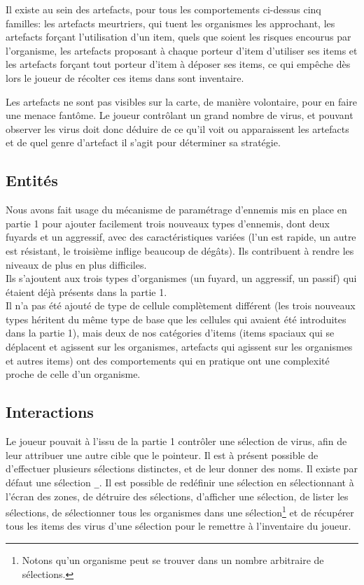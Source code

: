\documentclass[a4paper,french]{article}
\begin{document}
Il existe au sein des artefacts, pour tous les comportements ci-dessus cinq
familles: les artefacts meurtriers, qui tuent les organismes les approchant,
les artefacts forçant l'utilisation d'un item, quels que soient les risques
encourus par l'organisme, les artefacts proposant à chaque porteur d'item
d'utiliser ses items et les artefacts forçant tout porteur d'item à déposer ses
items, ce qui empêche dès lors le joueur de récolter ces items dans sont
inventaire.
\medskip

Les artefacts ne sont pas visibles sur la carte, de manière volontaire, pour en
faire une menace fantôme. Le joueur contrôlant un grand nombre de virus, et
pouvant observer les virus doit donc déduire de ce qu'il voit ou apparaissent
les artefacts et de quel genre d'artefact il s'agit pour déterminer sa
stratégie.



\subsection{Entit\'es}
Nous avons fait usage du m\'ecanisme de param\'etrage d'ennemis mis en place en partie 1 pour ajouter facilement trois nouveaux
types d'ennemis, dont deux fuyards et un aggressif, avec des caract\'eristiques vari\'ees (l'un est rapide, un autre est r\'esistant, le troisi\`eme
inflige beaucoup de d\'eg\^ats). Ils contribuent \`a rendre les niveaux de plus en plus difficiles.\\
Ils s'ajoutent aux trois types d'organismes (un fuyard, un aggressif, un passif) qui \'etaient d\'ej\`a pr\'esents dans la partie 1.\\

Il n'a pas \'et\'e ajout\'e de type de cellule compl\`etement diff\'erent (les trois nouveaux types h\'eritent du m\^eme type de base que
les cellules qui avaient \'et\'e introduites dans la partie 1), mais deux de nos cat\'egories d'items (items spaciaux qui se d\'eplacent et agissent sur
les organismes, artefacts qui agissent sur les organismes et autres items) ont des comportements qui en pratique
ont une complexit\'e proche de celle d'un organisme.

\subsection{Interactions}
Le joueur pouvait à l'issu de la partie 1 contrôler une sélection de virus, afin
de leur attribuer une autre cible que le pointeur. Il est à présent possible de
d'effectuer plusieurs sélections distinctes, et de leur donner des noms. Il
existe par défaut une sélection \texttt\_. Il est possible de redéfinir une
sélection en sélectionnant à l'écran des zones, de détruire des sélections,
d'afficher une sélection, de lister les sélections, de sélectionner tous les
organismes dans une sélection\footnote{Notons qu'un organisme peut se trouver
dans un nombre arbitraire de sélections.} et de récupérer tous les items des
virus d'une sélection pour le remettre à l'inventaire du joueur.\\
\end{document}
